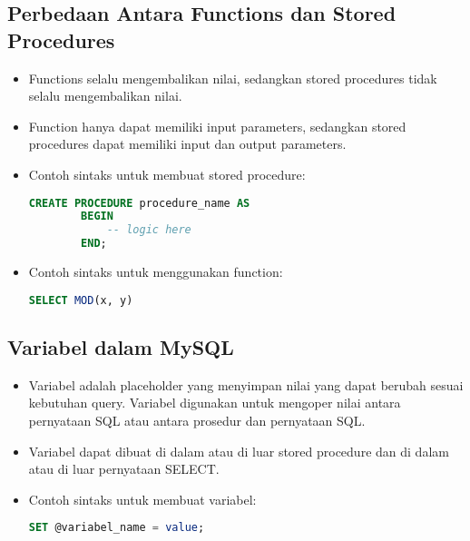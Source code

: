 \documentclass{article}
\begin{document}
\subsection{Perbedaan Antara Functions dan Stored Procedures}
\begin{itemize}
    \item Functions selalu mengembalikan nilai, sedangkan stored procedures tidak selalu mengembalikan nilai.
    \item Function hanya dapat memiliki input parameters, sedangkan stored procedures dapat memiliki input dan output  parameters.
    \item Contoh sintaks untuk membuat stored procedure:
          \begin{lstlisting}[language=SQL, caption={}, captionpos=b]
    CREATE PROCEDURE procedure_name AS
        BEGIN
            -- logic here
        END;
    \end{lstlisting}
    \item Contoh sintaks untuk menggunakan function:
          \begin{lstlisting}[language=SQL, caption={}, captionpos=b]
    SELECT MOD(x, y)
    \end{lstlisting}
\end{itemize}

\subsection{Variabel dalam MySQL}
\begin{itemize}
    \item Variabel adalah placeholder yang menyimpan nilai yang dapat berubah sesuai kebutuhan query. Variabel digunakan untuk mengoper nilai antara pernyataan SQL atau antara prosedur dan pernyataan SQL.
    \item Variabel dapat dibuat di dalam atau di luar stored procedure dan di dalam atau di luar pernyataan SELECT.
    \item Contoh sintaks untuk membuat variabel:
          \begin{lstlisting}[language=SQL, caption={}, captionpos=b]
    SET @variabel_name = value;
    \end{lstlisting}
\end{itemize}
\end{document}
